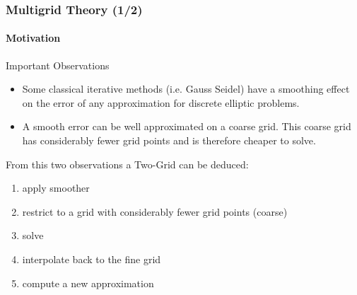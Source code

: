 \documentclass[xcolor=pdftex,table,10pt]{beamer}
\begin{document}
    	\begin{frame}
		\frametitle{Multigrid Theory (1/2)}
		\framesubtitle{Motivation}

		\begin{block}{Important Observations}
			\begin{itemize}
				\item Some classical iterative methods (i.e. Gauss Seidel) have a smoothing effect on the error of any approximation for discrete elliptic problems.
				\vspace{0.2cm}
				\item A smooth error can be well approximated on a coarse grid. This coarse grid has considerably fewer grid points and is therefore cheaper to solve.
			\end{itemize}
		\end{block}

		\pause
		\vspace{0.4cm}

		From this two observations a Two-Grid can be deduced:

		\begin{enumerate}
			\item apply smoother
			\item restrict to a grid with considerably fewer grid points (coarse)
			\item solve
			\item interpolate back to the fine grid
			\item compute a new approximation
		\end{enumerate}

	\end{frame}
    	
\end{document}
